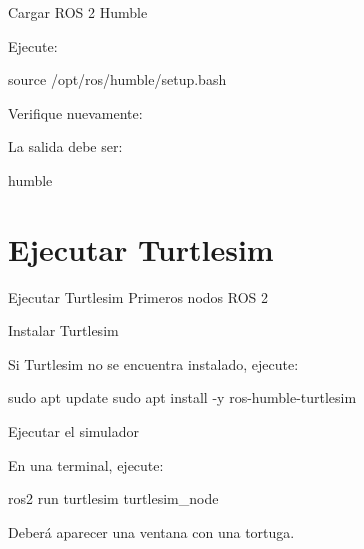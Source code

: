 \documentclass[aspectratio=169]{beamer}
\begin{document}
\begin{frame}[fragile]{Cargar ROS 2 Humble}

Ejecute:

\begin{bashcodedark}
    source /opt/ros/humble/setup.bash
\end{bashcodedark}

Verifique nuevamente:


La salida debe ser:

\begin{bashcode}
    humble
\end{bashcode}

\vspace{0.3cm}


\end{frame}

\section{Ejecutar Turtlesim}

\SectionSlide
{Ejecutar Turtlesim}
{Primeros nodos ROS 2}

\begin{frame}[fragile]{Instalar Turtlesim}

Si Turtlesim no se encuentra instalado, ejecute:

\begin{bashcodedark}
    sudo apt update
    sudo apt install -y ros-humble-turtlesim
\end{bashcodedark}

\vspace{0.3cm}


\end{frame}

\begin{frame}[fragile]{Ejecutar el simulador}

En una terminal, ejecute:

\begin{bashcodedark}
    ros2 run turtlesim turtlesim_node
\end{bashcodedark}

Deberá aparecer una ventana con una tortuga.

\vspace{0.3cm}


\end{frame}
\end{document}
